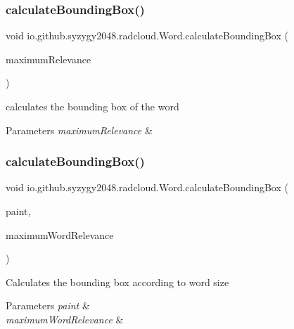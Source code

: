 \subsubsection{\texorpdfstring{calculate\+Bounding\+Box()}{calculateBoundingBox()}\hspace{0.1cm}{\footnotesize\ttfamily [1/2]}}
{\footnotesize\ttfamily void io.\+github.\+syzygy2048.\+radcloud.\+Word.\+calculate\+Bounding\+Box (\begin{DoxyParamCaption}\item[{float}]{maximum\+Relevance }\end{DoxyParamCaption})}

calculates the bounding box of the word 
\begin{DoxyParams}{Parameters}
{\em maximum\+Relevance} & \\
\hline
\end{DoxyParams}
\mbox{\label{classio_1_1github_1_1syzygy2048_1_1radcloud_1_1_word_a3bd7b70cf654bbe3c0f6db2bfbaf0929}} 
\subsubsection{\texorpdfstring{calculate\+Bounding\+Box()}{calculateBoundingBox()}\hspace{0.1cm}{\footnotesize\ttfamily [2/2]}}
{\footnotesize\ttfamily void io.\+github.\+syzygy2048.\+radcloud.\+Word.\+calculate\+Bounding\+Box (\begin{DoxyParamCaption}\item[{Paint}]{paint,  }\item[{float}]{maximum\+Word\+Relevance }\end{DoxyParamCaption})}

Calculates the bounding box according to word size 
\begin{DoxyParams}{Parameters}
{\em paint} & \\
\hline
{\em maximum\+Word\+Relevance} & \\
\hline
\end{DoxyParams}
\mbox{\label{classio_1_1github_1_1syzygy2048_1_1radcloud_1_1_word_ad35bce76832c85b100a4346da0f20a00}} 
